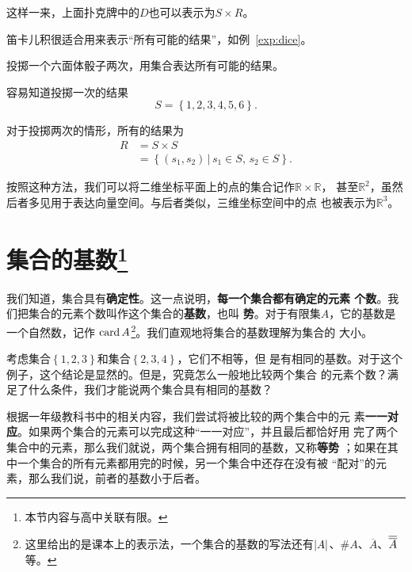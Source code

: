 这样一来，上面扑克牌中的$D$也可以表示为$S\times R$。

笛卡儿积很适合用来表示“所有可能的结果”，如例~\ref{exp:dice}。

\begin{rawexp}\label{exp:dice}
    投掷一个六面体骰子两次，用集合表达所有可能的结果。
\end{rawexp}

\begin{rawsol}
    容易知道投掷一次的结果
    \[
        S = \left\{ 1,2,3,4,5,6 \right\}.
    \]

    对于投掷两次的情形，所有的结果为
    \begin{align*}
        R &= S \times S\\
          &= \left\{ \left( s_{1},s_{2} \right) \,|\, s_{1}\in S,\,s_{2}\in S \right\} .
    \end{align*}
\end{rawsol}

按照这种方法，我们可以将二维坐标平面上的点的集合记作$\mathbb{R}\times\mathbb{R}$，
甚至$\mathbb{R}^2$，虽然后者多见用于表达向量空间。与后者类似，三维坐标空间中的点
也被表示为$\mathbb{R}^3$。

\section[集合的基数]{集合的基数\footnote{本节内容与高中关联有限。}}

我们知道，集合具有\textbf{确定性}。这一点说明，\textbf{每一个集合都有确定的元素
个数}。我们把集合的元素个数叫作这个集合的\textbf{基数}，也叫
\textbf{势}。对于有限集$A$，它的基数是一个自然数，记作
$\operatorname{card}{A}$\footnote{这里给出的是课本上的表示法，一个集合的基数的写法还有$\left|{A}\right|
$、$\# A$、$\overline{A}$、$\overline{\overline{{A}}}$等。}。我们直观地将集合的基数理解为集合的
大小。

考虑集合$\left\{ 1,2,3 \right\} $和集合$\left\{ 2,3,4 \right\} $，它们不相等，但
是有相同的基数。对于这个例子，这个结论是显然的。但是，究竟怎么一般地比较两个集合
的元素个数？满足了什么条件，我们才能说两个集合具有相同的基数？

根据一年级教科书中的相关内容\cite{pep_math_1A}，我们尝试将被比较的两个集合中的元
素\textbf{一一对应}。如果两个集合的元素可以完成这种“一一对应”，并且最后都恰好用
完了两个集合中的元素，那么我们就说，两个集合拥有相同的基数，又称\textbf{等势}
；如果在其中一个集合的所有元素都用完的时候，另一个集合中还存在没有被
“配对”的元素，那么我们说，前者的基数小于后者。

